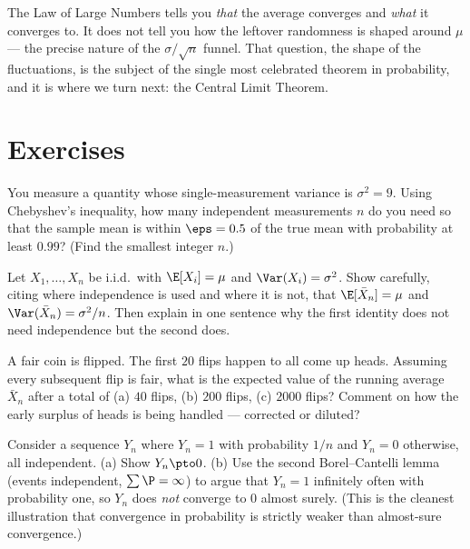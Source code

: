 The Law of Large Numbers tells you \emph{that} the average converges and \emph{what} it converges to. It does not tell you how the leftover randomness is shaped around $\mu$ --- the precise nature of the $\sigma/\sqrt n$ funnel. That question, the shape of the fluctuations, is the subject of the single most celebrated theorem in probability, and it is where we turn next: the Central Limit Theorem.

\section{Exercises}
\label{ch20:exercises}

\begin{exercise}
You measure a quantity whose single-measurement variance is $\sigma^2 = 9$. Using Chebyshev's inequality, how many independent measurements $n$ do you need so that the sample mean is within $\eps = 0.5$ of the true mean with probability at least $0.99$? (Find the smallest integer $n$.)
\end{exercise}

\begin{exercise}
Let $X_1,\dots,X_n$ be i.i.d.\ with $\E[X_i]=\mu$ and $\Var(X_i)=\sigma^2$. Show carefully, citing where independence is used and where it is not, that $\E[\bar X_n]=\mu$ and $\Var(\bar X_n)=\sigma^2/n$. Then explain in one sentence why the first identity does not need independence but the second does.
\end{exercise}

\begin{exercise}
A fair coin is flipped. The first $20$ flips happen to all come up heads. Assuming every subsequent flip is fair, what is the expected value of the running average $\bar X_n$ after a total of (a) $40$ flips, (b) $200$ flips, (c) $2000$ flips? Comment on how the early surplus of heads is being handled --- corrected or diluted?
\end{exercise}

\begin{exercise}
Consider a sequence $Y_n$ where $Y_n = 1$ with probability $1/n$ and $Y_n=0$ otherwise, all independent. (a) Show $Y_n \pto 0$. (b) Use the second Borel--Cantelli lemma (events independent, $\sum \P=\infty$) to argue that $Y_n=1$ infinitely often with probability one, so $Y_n$ does \emph{not} converge to $0$ almost surely. (This is the cleanest illustration that convergence in probability is strictly weaker than almost-sure convergence.)
\end{exercise}

